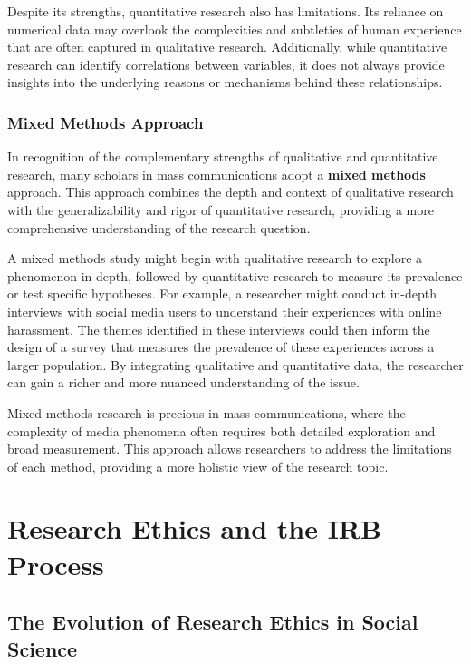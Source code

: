 \documentclass[
]{book}
\begin{document}
Despite its strengths, quantitative research also has limitations. Its reliance on numerical data may overlook the complexities and subtleties of human experience that are often captured in qualitative research. Additionally, while quantitative research can identify correlations between variables, it does not always provide insights into the underlying reasons or mechanisms behind these relationships.

\subsection*{Mixed Methods Approach}\label{mixed-methods-approach}

In recognition of the complementary strengths of qualitative and quantitative research, many scholars in mass communications adopt a \textbf{mixed methods} approach. This approach combines the depth and context of qualitative research with the generalizability and rigor of quantitative research, providing a more comprehensive understanding of the research question.

A mixed methods study might begin with qualitative research to explore a phenomenon in depth, followed by quantitative research to measure its prevalence or test specific hypotheses. For example, a researcher might conduct in-depth interviews with social media users to understand their experiences with online harassment. The themes identified in these interviews could then inform the design of a survey that measures the prevalence of these experiences across a larger population. By integrating qualitative and quantitative data, the researcher can gain a richer and more nuanced understanding of the issue.

Mixed methods research is precious in mass communications, where the complexity of media phenomena often requires both detailed exploration and broad measurement. This approach allows researchers to address the limitations of each method, providing a more holistic view of the research topic.

\chapter{Research Ethics and the IRB Process}\label{research-ethics-and-the-irb-process}

\section{The Evolution of Research Ethics in Social Science}\label{the-evolution-of-research-ethics-in-social-science}
\end{document}
